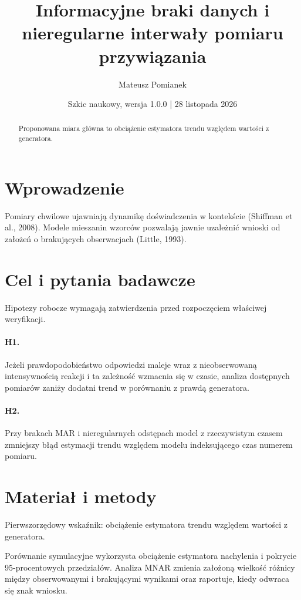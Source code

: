 \documentclass[11pt,a4paper]{article}
\title{Informacyjne braki danych i nieregularne interwały pomiaru przywiązania}
\author{Mateusz Pomianek}
\date{Szkic naukowy, wersja 1.0.0 | 28 listopada 2026}
\begin{document}
\maketitle

\begin{abstract}

Proponowana miara główna to obciążenie estymatora trendu względem wartości z generatora.

\end{abstract}

\section{Wprowadzenie}

Pomiary chwilowe ujawniają dynamikę doświadczenia w kontekście (Shiffman et al., 2008). Modele mieszanin wzorców pozwalają jawnie uzależnić wnioski od założeń o brakujących obserwacjach (Little, 1993).

\section{Cel i pytania badawcze}

Hipotezy robocze wymagają zatwierdzenia przed rozpoczęciem właściwej weryfikacji.

\paragraph{H1.} Jeżeli prawdopodobieństwo odpowiedzi maleje wraz z nieobserwowaną intensywnością reakcji i ta zależność wzmacnia się w czasie, analiza dostępnych pomiarów zaniży dodatni trend w porównaniu z prawdą generatora.

\paragraph{H2.} Przy brakach MAR i nieregularnych odstępach model z rzeczywistym czasem zmniejszy błąd estymacji trendu względem modelu indeksującego czas numerem pomiaru.

\section{Materiał i metody}

Pierwszorzędowy wskaźnik: obciążenie estymatora trendu względem wartości z generatora.

Porównanie symulacyjne wykorzysta obciążenie estymatora nachylenia i pokrycie 95-procentowych przedziałów. Analiza MNAR zmienia założoną wielkość różnicy między obserwowanymi i brakującymi wynikami oraz raportuje, kiedy odwraca się znak wniosku.
\end{document}
